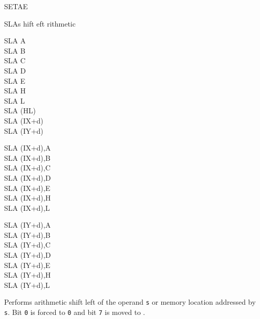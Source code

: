 \begin{basedescript}{
	\desclabelstyle{\multilinelabel}
	\desclabelwidth{3cm}}
\begin{DetailItem}{SETAE}{\DetailItemZXN}
	\end{DetailItem}

	\pagebreak


	\begin{DetailItem}{SLA}{s}
		{hift eft rithmetic}
		{}
		
		\begin{DetailVariants}
			SLA A\\
			SLA B\\
			SLA C\\
			SLA D\\
			SLA E\\
			SLA H\\
			SLA L\\
			SLA (HL)\\
			SLA (IX+d)\\
			SLA (IY+d)

			\columnbreak
			SLA (IX+d),A\UNDOC\\
			SLA (IX+d),B\UNDOC\\
			SLA (IX+d),C\UNDOC\\
			SLA (IX+d),D\UNDOC\\
			SLA (IX+d),E\UNDOC\\
			SLA (IX+d),H\UNDOC\\
			SLA (IX+d),L\UNDOC

			\columnbreak
			SLA (IY+d),A\UNDOC\\
			SLA (IY+d),B\UNDOC\\
			SLA (IY+d),C\UNDOC\\
			SLA (IY+d),D\UNDOC\\
			SLA (IY+d),E\UNDOC\\
			SLA (IY+d),H\UNDOC\\
			SLA (IY+d),L\UNDOC
		\end{DetailVariants}

		Performs arithmetic shift left of the operand {\tt s} or memory location addressed by {\tt s}. Bit {\tt 0} is forced to {\tt 0} and bit {\tt 7} is moved to \FlagCF{}.


\end{DetailItem}
\end{basedescript}
